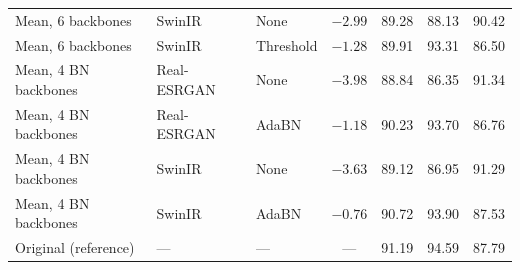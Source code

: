 \documentclass[11pt]{article}
\begin{document}
{\begin{longtable}{@{}lllcccc@{}}
Mean, 6 backbones & SwinIR & None & $-2.99$ & 89.28 & 88.13 & 90.42 \\
Mean, 6 backbones & SwinIR & Threshold & $-1.28$ & 89.91 & 93.31 & 86.50 \\
Mean, 4 BN backbones & Real-ESRGAN & None & $-3.98$ & 88.84 & 86.35 & 91.34 \\
Mean, 4 BN backbones & Real-ESRGAN & AdaBN & $-1.18$ & 90.23 & 93.70 & 86.76 \\
Mean, 4 BN backbones & SwinIR & None & $-3.63$ & 89.12 & 86.95 & 91.29 \\
Mean, 4 BN backbones & SwinIR & AdaBN & $-0.76$ & 90.72 & 93.90 & 87.53 \\
Original (reference) & --- & --- & --- & 91.19 & 94.59 & 87.79 \\
\bottomrule
\end{longtable}
}
\end{document}
